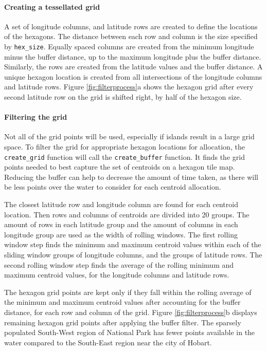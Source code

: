 \hypertarget{creating-a-tessellated-grid}{%
\paragraph{Creating a tessellated
grid}\label{creating-a-tessellated-grid}}

A set of longitude columns, and latitude rows are created to define the
locations of the hexagons. The distance between each row and column is
the size specified by \texttt{hex\_size}. Equally spaced columns are
created from the minimum longitude minus the buffer distance, up to the
maximum longitude plus the buffer distance. Similarly, the rows are
created from the latitude values and the buffer distance. A unique
hexagon location is created from all intersections of the longitude
columns and latitude rows. Figure \ref{fig:filterprocess}a shows the
hexagon grid after every second latitude row on the grid is shifted
right, by half of the hexagon size.

\hypertarget{filtering-the-grid}{%
\paragraph{Filtering the grid}\label{filtering-the-grid}}

Not all of the grid points will be used, especially if islands result in
a large grid space. To filter the grid for appropriate hexagon locations
for allocation, the \texttt{create\_grid} function will call the
\texttt{create\_buffer} function. It finds the grid points needed to
best capture the set of centroids on a hexagon tile map. Reducing the
buffer can help to decrease the amount of time taken, as there will be
less points over the water to consider for each centroid allocation.

The closest latitude row and longitude column are found for each
centroid location. Then rows and columns of centroids are divided into
20 groups. The amount of rows in each latitude group and the amount of
columns in each longitude group are used as the width of rolling
windows. The first rolling window step finds the minimum and maximum
centroid values within each of the sliding window groups of longitude
columns, and the groups of latitude rows. The second rolling window step
finds the average of the rolling minimum and maximum centroid values,
for the longitude columns and latitude rows.

The hexagon grid points are kept only if they fall within the rolling
average of the minimum and maximum centroid values after accounting for
the buffer distance, for each row and column of the grid. Figure
\ref{fig:filterprocess}b displays remaining hexagon grid points after
applying the buffer filter. The sparsely populated South-West region of
National Park has fewer points available in the water compared to the
South-East region near the city of Hobart.

